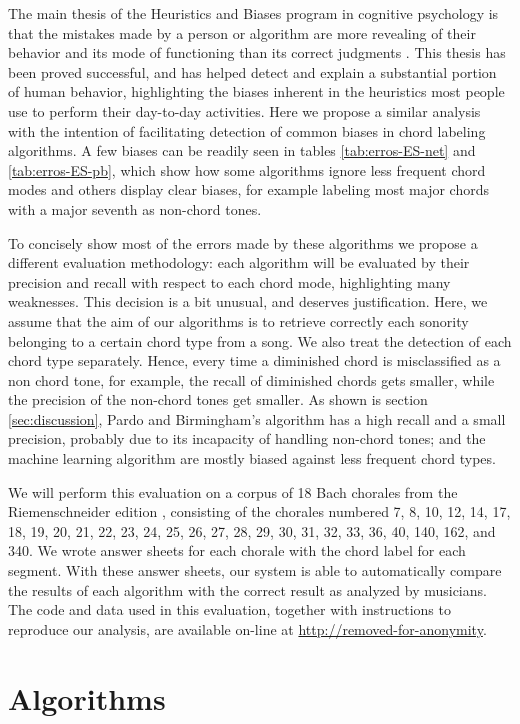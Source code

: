 \documentclass{article}
\begin{document}
The main thesis of the Heuristics and Biases program in cognitive
psychology is that the mistakes made by a person or algorithm are more
revealing of their behavior and its mode of functioning than its
correct judgments \cite{gilovich.ea02:heuristics}. This thesis has
been proved successful, and has helped detect and explain a
substantial portion of human behavior, highlighting the biases
inherent in the heuristics most people use to perform their day-to-day
activities. Here we propose a similar analysis with the intention of
facilitating detection of common biases in chord labeling
algorithms. A few biases can be readily seen in tables
\ref{tab:erros-ES-net} and \ref{tab:erros-ES-pb}, which show how some
algorithms ignore less frequent chord modes and others display clear
biases, for example labeling most major chords with a major seventh as
non-chord tones.

To concisely show most of the errors made by these algorithms we
propose a different evaluation methodology: each algorithm will be
evaluated by their precision and recall with respect to each chord
mode, highlighting many weaknesses. This decision is a bit unusual,
and deserves justification. Here, we assume that the aim of our
algorithms is to retrieve correctly each sonority belonging to a
certain chord type from a song. We also treat the detection of each
chord type separately. Hence, every time a diminished chord is
misclassified as a non chord tone, for example, the recall of
diminished chords gets smaller, while the precision of the non-chord
tones get smaller. As shown is section \ref{sec:discussion}, Pardo and
Birmingham's algorithm has a high recall and a small precision,
probably due to its incapacity of handling non-chord tones; and the
machine learning algorithm are mostly biased against less frequent
chord types.

We will perform this evaluation on a corpus of 18 Bach chorales from
the Riemenschneider edition \cite{bach41:371}, consisting of the
chorales numbered 7, 8, 10, 12, 14, 17, 18, 19, 20, 21, 22, 23, 24,
25, 26, 27, 28, 29, 30, 31, 32, 33, 36, 40, 140, 162, and 340. We
wrote answer sheets for each chorale with the chord label for each
segment. With these answer sheets, our system is able to automatically
compare the results of each algorithm with the correct result as
analyzed by musicians. The code and data used in this evaluation,
together with instructions to reproduce our analysis, are available
on-line at \url{http://removed-for-anonymity}.

\section{Algorithms}
\label{sec:algorithms}
\end{document}

